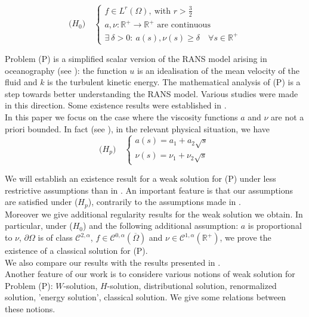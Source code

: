 \documentclass{elsart}
\begin{document}
$$
\text{($H_0$)}  \quad\left\{
	\begin{array}{l}
	  f \in L^r(\Omega), \ \text{with } r > \frac{3}{2} \\ 
	  a, \nu: \mathbb R^{+} \to \mathbb R^{+} \text{ are continuous}\\ 
	  \exists \ \delta > 0: \ a(s),\nu(s) \geq \delta \quad
	  \forall s \in \mathbb R^{+}
	  \end{array}
	\right.
$$

Problem (P) is a simplified scalar version of the RANS model arising
in oceanography (see \cite{lewan,lewan2,num2}): the function $u$ is an 
idealisation of the mean velocity of the fluid and $k$ is the
turbulent kinetic energy. The mathematical analysis of (P) is a step 
towards better understanding the RANS model. Various studies were
made in this direction. Some existence results were established in
\cite{lewan,gal}. \\ 
In this paper we focus on the case where the viscosity functions $a$
and $\nu$ are not a priori bounded. In fact (see \cite{lewan2,gal}), in the
relevant physical situation, we have 
$$
\text{($H_p$)}  \quad\left\{
	\begin{array}{l}
	  a(s) = a_1 + a_2 \sqrt{s} \\ 
	  \nu(s) = \nu_1 + \nu_2 \sqrt{s}
	  \end{array}
	\right.
$$ 

We will establish an existence result for a weak solution for (P) under
less restrictive assumptions than in \cite{gal}. An important feature is that our assumptions are
satisfied under ($H_p$), contrarily to the assumptions made in \cite{gal}. \\ 
Moreover we give additional regularity results for the weak solution
we obtain. In particular, under ($H_0$) and the following additional
assumption: $a$ is proportional to $\nu$, $\partial \Omega$ is of class
$\mathcal{C}^{2,\alpha}$, $f \in
\mathcal{C}^{0,\alpha}(\overline{\Omega})$ and $\nu \in
\mathcal{C}^{1,\alpha}(\mathbb R^{+})$, we prove the existence of a classical solution for
(P). \\ 

We also compare our results with the results presented in
\cite{lewan}. \\ 

Another feature of our work is to considere various notions
of weak solution for Problem (P): $W$-solution, $H$-solution,
distributional solution, renormalized solution, 'energy solution',
classical solution. We give some relations between these notions.
\end{document}
